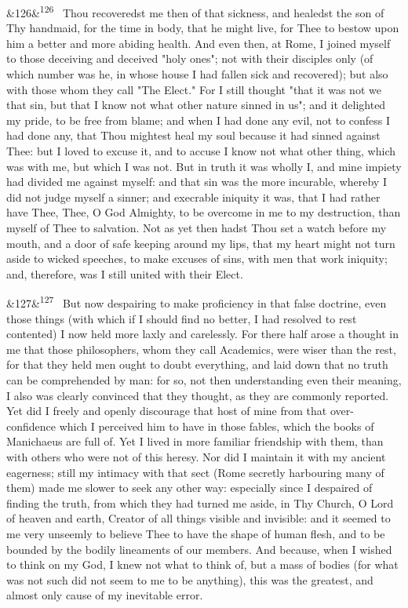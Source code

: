 \documentclass[12pt]{article}
\newcommand{\para}[1][]{\par\noindent\ifx&#1&\else\textsuperscript{\footnotesize #1}~\fi}
\begin{document}
\para[126] Thou recoveredst me then of that sickness, and healedst the son of Thy handmaid, for the time in body, that he might live, for Thee to bestow upon him a better and more abiding health. And even then, at Rome, I joined myself to those deceiving and deceived "holy ones"; not with their disciples only (of which number was he, in whose house I had fallen sick and recovered); but also with those whom they call "The Elect." For I still thought "that it was not we that sin, but that I know not what other nature sinned in us"; and it delighted my pride, to be free from blame; and when I had done any evil, not to confess I had done any, that Thou mightest heal my soul because it had sinned against Thee: but I loved to excuse it, and to accuse I know not what other thing, which was with me, but which I was not. But in truth it was wholly I, and mine impiety had divided me against myself: and that sin was the more incurable, whereby I did not judge myself a sinner; and execrable iniquity it was, that I had rather have Thee, Thee, O God Almighty, to be overcome in me to my destruction, than myself of Thee to salvation. Not as yet then hadst Thou set a watch before my mouth, and a door of safe keeping around my lips, that my heart might not turn aside to wicked speeches, to make excuses of sins, with men that work iniquity; and, therefore, was I still united with their Elect.

\para[127] But now despairing to make proficiency in that false doctrine, even those things (with which if I should find no better, I had resolved to rest contented) I now held more laxly and carelessly. For there half arose a thought in me that those philosophers, whom they call Academics, were wiser than the rest, for that they held men ought to doubt everything, and laid down that no truth can be comprehended by man: for so, not then understanding even their meaning, I also was clearly convinced that they thought, as they are commonly reported. Yet did I freely and openly discourage that host of mine from that over-confidence which I perceived him to have in those fables, which the books of Manichaeus are full of. Yet I lived in more familiar friendship with them, than with others who were not of this heresy. Nor did I maintain it with my ancient eagerness; still my intimacy with that sect (Rome secretly harbouring many of them) made me slower to seek any other way: especially since I despaired of finding the truth, from which they had turned me aside, in Thy Church, O Lord of heaven and earth, Creator of all things visible and invisible: and it seemed to me very unseemly to believe Thee to have the shape of human flesh, and to be bounded by the bodily lineaments of our members. And because, when I wished to think on my God, I knew not what to think of, but a mass of bodies (for what was not such did not seem to me to be anything), this was the greatest, and almost only cause of my inevitable error.
\end{document}
